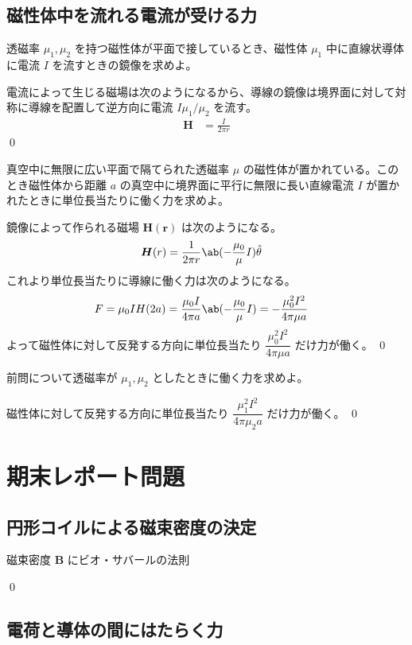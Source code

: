 \documentclass[uplatex,dvipdfmx,a4paper,11pt]{jlreq}
\makeatletter
\newcommand{\BB}{\bm{B}}
\newcommand{\HH}{\bm{H}}
\newcommand{\rr}{\bm{r}}
\numberwithin{equation}{section}
\theoremstyle{definition}
\renewenvironment{proof}[1][\proofname]{\par
  \normalfont
  \topsep6\p@\@plus6\p@ \trivlist
  \item[\hskip\labelsep{\bfseries #1}\@addpunct{\bfseries}]\ignorespaces\quad\par
}{%
  \qed\endtrivlist\@endpefalse
}
\renewcommand\proofname{証明}
\makeatother
\begin{document}
\subsection{磁性体中を流れる電流が受ける力}
\begin{problem}
透磁率 $\mu_1, \mu_2$ を持つ磁性体が平面で接しているとき、磁性体 $\mu_1$ 中に直線状導体に電流 $I$ を流すときの鏡像を求めよ。
\end{problem}
\begin{proof}
  電流によって生じる磁場は次のようになるから、導線の鏡像は境界面に対して対称に導線を配置して逆方向に電流 $I\mu_1/\mu_2$ を流す。
  \begin{align}
    \HH & = \frac{I}{2\pi r}
  \end{align}
\end{proof}

\begin{problem}
真空中に無限に広い平面で隔てられた透磁率 $\mu$ の磁性体が置かれている。このとき磁性体から距離 $a$ の真空中に境界面に平行に無限に長い直線電流 $I$ が置かれたときに単位長当たりに働く力を求めよ。
\end{problem}
\begin{proof}
  鏡像によって作られる磁場 $\HH(\rr)$ は次のようになる。
  \begin{align}
    \HH(r) & = \frac{1}{2\pi r}\ab(-\frac{\mu_0}{\mu}I)\hat{\theta}
  \end{align}
  これより単位長当たりに導線に働く力は次のようになる。
  \begin{align}
    F & = \mu_0IH(2a) = \frac{\mu_0I}{4\pi a}\ab(-\frac{\mu_0}{\mu}I) = -\frac{\mu_0^2I^2}{4\pi\mu a}
  \end{align}
  よって磁性体に対して反発する方向に単位長当たり $\dfrac{\mu_0^2I^2}{4\pi\mu a}$ だけ力が働く。
\end{proof}

\begin{problem}
前問について透磁率が $\mu_1, \mu_2$ としたときに働く力を求めよ。
\end{problem}
\begin{proof}
  磁性体に対して反発する方向に単位長当たり $\dfrac{\mu_1^2I^2}{4\pi\mu_2 a}$ だけ力が働く。
\end{proof}



\setcounter{section}{8}
\section{期末レポート問題}
\subsection{円形コイルによる磁束密度の決定}
\begin{problem}
磁束密度 $\BB$ にビオ・サバールの法則
\end{problem}
\begin{proof}

\end{proof}


\subsection{電荷と導体の間にはたらく力}
\end{document}
